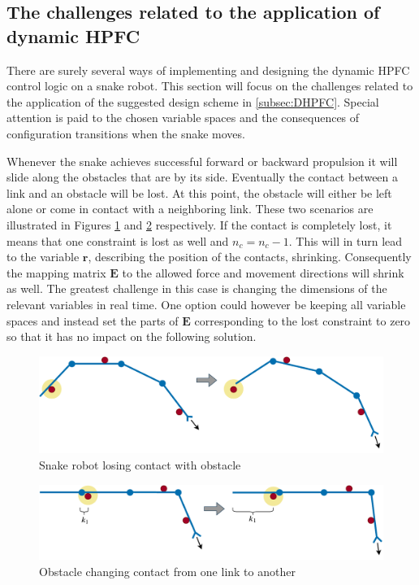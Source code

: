 \subsection{The challenges related to the application of dynamic HPFC}

There are surely several ways of implementing and designing the dynamic HPFC control logic on a snake robot. This section will focus on the challenges related to the application of the suggested design scheme in \ref{subsec:DHPFC}. Special attention is paid to the chosen variable spaces and the consequences of configuration transitions when the snake moves.

Whenever the snake achieves successful forward or backward propulsion it will slide along the obstacles that are by its side. Eventually the contact between a link and an obstacle will be lost. At this point, the obstacle will either be left alone or come in contact with a neighboring link. These two scenarios are illustrated in Figures \ref{fig:obst_slide_seq1} and \ref{fig:obst_slide_seq2} respectively. If the contact is completely lost, it means that one constraint is lost as well and $n_c = n_c - 1$. This will in turn lead to the variable $\mathbf{r}$, describing the position of the contacts, shrinking. Consequently the mapping matrix $\mathbf{E}$ to the allowed force and movement directions will shrink as well. The greatest challenge in this case is changing the dimensions of the relevant variables in real time. One option could however be keeping all variable spaces and instead set the parts of $\mathbf{E}$ corresponding to the lost constraint to zero so that it has no impact on the following solution.

\begin{figure}
    \centering
    \includegraphics[width=\textwidth]{figures/theory/obst_slide_sequence1.pdf}
    \caption{Snake robot losing contact with obstacle}
    \label{fig:obst_slide_seq1}
\end{figure}

\begin{figure}
    \centering
    \includegraphics[width=\textwidth]{figures/theory/obst_slide_sequence2.pdf}
    \caption{Obstacle changing contact from one link to another}
    \label{fig:obst_slide_seq2}
\end{figure}

